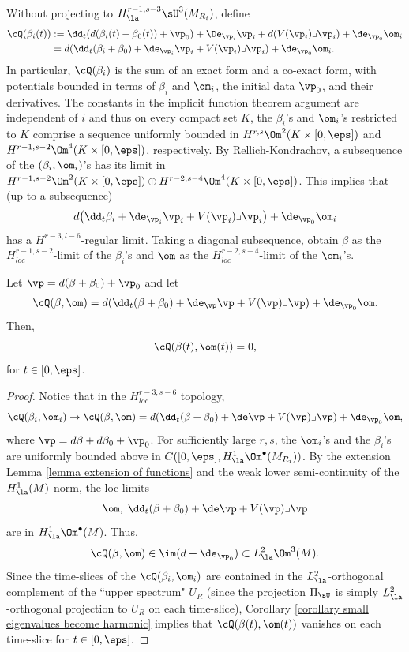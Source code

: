 \documentclass[hidelinks, 12pt, oneside, reqno]{amsart}
\begin{document}
Without projecting to $H^{r-1,s-3}_{\la}\sU^3(M_{R_i})$, define
\begin{align*}
    \cQ(\beta_i(t)) &:= \dd_t(d(\beta_i(t) + \beta_0(t)) + \vp_0) + \De_{\vp_i}\vp_i + d(V(\vp_i)\lrcorner \vp_i) + \de_{\vp_0} \om_i\\
    &= d(\dd_t (\beta_i + \beta_0) + \de_{\vp_i}\vp_i  + V(\vp_i) \lrcorner \vp_i) + \de_{\vp_0} \om_i.
\end{align*}
In particular, $\cQ(\beta_i)$ is the sum of an exact form and a co-exact form, with potentials bounded in terms of $\beta_i$ and $\om_i$, the initial data $\vp_0$, and their derivatives. The constants in the implicit function theorem argument are independent of $i$ and thus on every compact set $K$, the $\beta_i$'s and $\om_i$'s restricted to $K$ comprise a sequence uniformly bounded in $H^{r,s}\Om^2(K \times [0, \eps])$ and $H^{r-1,s-2}\Om^4(K \times [0, \eps])$, respectively. By Rellich-Kondrachov, a subsequence of the $(\beta_i,\om_i)$'s has its limit in $H^{r-1,s-2}\Om^2(K \times [0, \eps]) \oplus H^{r-2,s-4}\Om^4(K \times [0, \eps])$. This implies that (up to a subsequence)
\[
d \big(\dd_t \beta_i + \de_{\vp_i}\vp_i  + V(\vp_i) \lrcorner \vp_i\big) + \de_{\vp_0} \om_i
\]
has a $H^{r-3,l-6}$-regular limit. Taking a diagonal subsequence, obtain $\beta$ as the $H^{r-1,s-2}_{loc}$-limit of the $\beta_i$'s and $\om$ as the $H^{r-2,s-4}_{loc}$-limit of the $\om_i$'s. 
\begin{prop}\label{proposition solution on whole space up to coexact}
Let $\vp = d(\beta + \beta_0) + \vp_0$ and let
\[
\cQ(\beta,\om) = d(\dd_t (\beta + \beta_0) + \de_\vp \vp  + V(\vp) \lrcorner \vp) + \de_{\vp_0} \om.
\]
Then,
\[
\cQ(\beta(t),\om(t)) = 0,
\]
for $t \in [0, \eps]$. 
\end{prop}

\begin{proof}
Notice that in the $H^{r-3,s-6}_{loc}$ topology,
\[
\cQ(\beta_i,\om_i) \rightarrow \cQ(\beta,\om) = d(\dd_t (\beta + \beta_0) + \de\vp  + V(\vp) \lrcorner \vp) + \de_{\vp_0} \om,
\]
where $\vp = d\beta + d\beta_0 + \vp_0$. For sufficiently large $r,s$, the $\om_i$'s and the $\beta_i$'s are uniformly bounded above in $C([0,\eps], H^1_{\la}\Om^\bullet(M_{R_i}))$. By the extension Lemma \ref{lemma extension of functions} and the weak lower semi-continuity of the $H^1_{\la}(M)$-norm, the loc-limits 
\[
\om, \; \dd_t (\beta + \beta_0) + \de\vp  + V(\vp) \lrcorner \vp
\]
are in $H^1_\la \Om^\bullet(M)$. Thus, 
\[
\cQ(\beta, \om) \in \im(d + \de_{\vp_0}) \subset L^2_{\la}\Om^3(M).
\]
Since the time-slices of the $\cQ(\beta_i,\om_i)$ are contained in the $L^2_\la$-orthogonal complement of the ``upper spectrum" $U_R$ (since the projection $\Pi_{\sU}$ is simply $L^2_{\la}$-orthogonal projection to $U_R$ on each time-slice), Corollary \ref{corollary small eigenvalues become harmonic} implies that $\cQ(\beta(t),\om(t))$ vanishes on each time-slice for $t \in [0,\eps]$. 
\end{proof}
\end{document}
